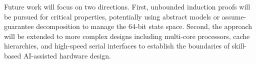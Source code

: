 \documentclass[conference]{IEEEtran}
\begin{document}
Future work will focus on two directions. First, unbounded induction proofs will be pursued for critical properties, potentially using abstract models or assume-guarantee decomposition to manage the 64-bit state space. Second, the approach will be extended to more complex designs including multi-core processors, cache hierarchies, and high-speed serial interfaces to establish the boundaries of skill-based AI-assisted hardware design.

\clearpage


\end{document}

